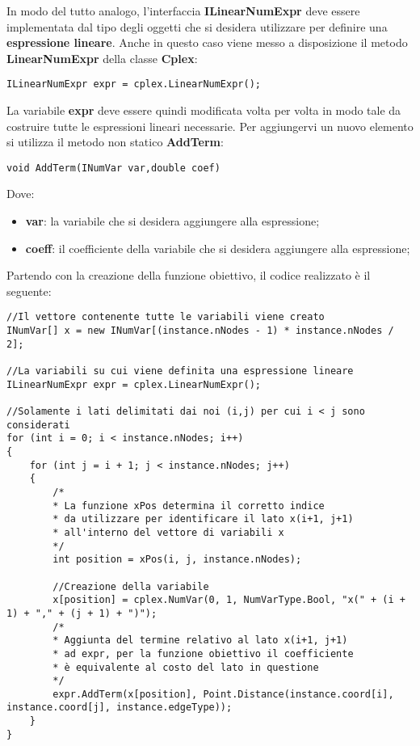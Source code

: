 \documentclass[11pt]{article}
\begin{document}
In modo del tutto analogo, l'interfaccia \textbf{ILinearNumExpr} deve essere implementata dal tipo degli oggetti che si desidera utilizzare per definire una \textbf{espressione lineare}. Anche in questo caso viene messo a disposizione il metodo \textbf{LinearNumExpr} della classe \textbf{Cplex}:

\begin{lstlisting}
ILinearNumExpr expr = cplex.LinearNumExpr();
\end{lstlisting}

La variabile \textbf{expr} deve essere quindi modificata volta per volta in modo tale da costruire tutte le espressioni lineari necessarie. Per aggiungervi un nuovo elemento si utilizza il metodo non statico \textbf{AddTerm}:

\begin{lstlisting}
void AddTerm(INumVar var,double coef)
\end{lstlisting}

Dove:

\begin{itemize}
\item \textbf{var}: la variabile che si desidera aggiungere alla espressione;
\item  \textbf{coeff}: il coefficiente della variabile che si desidera aggiungere alla espressione;
\end{itemize}

Partendo con la creazione della funzione obiettivo, il codice realizzato è il seguente:

\begin{lstlisting}
//Il vettore contenente tutte le variabili viene creato
INumVar[] x = new INumVar[(instance.nNodes - 1) * instance.nNodes / 2];

//La variabili su cui viene definita una espressione lineare
ILinearNumExpr expr = cplex.LinearNumExpr();

//Solamente i lati delimitati dai noi (i,j) per cui i < j sono considerati
for (int i = 0; i < instance.nNodes; i++)
{
    for (int j = i + 1; j < instance.nNodes; j++)
    {
        /*
        * La funzione xPos determina il corretto indice
        * da utilizzare per identificare il lato x(i+1, j+1)
        * all'interno del vettore di variabili x
        */
        int position = xPos(i, j, instance.nNodes);
        
        //Creazione della variabile
        x[position] = cplex.NumVar(0, 1, NumVarType.Bool, "x(" + (i + 1) + "," + (j + 1) + ")");
        /*
        * Aggiunta del termine relativo al lato x(i+1, j+1)
        * ad expr, per la funzione obiettivo il coefficiente
        * è equivalente al costo del lato in questione
        */
        expr.AddTerm(x[position], Point.Distance(instance.coord[i], instance.coord[j], instance.edgeType));
    }
}

\end{lstlisting}
\end{document}
